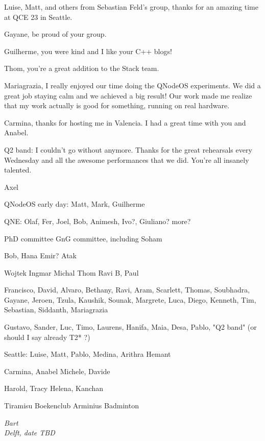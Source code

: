Luise, Matt, and others from Sebastian Feld's group, thanks for an amazing time at QCE 23 in Seattle.

Gayane, be proud of your group.

Guilherme, you were kind and I like your C++ blogs!

Thom, you're a great addition to the Stack team.

Mariagrazia, I really enjoyed our time doing the QNodeOS experiments. We did a great job staying calm and we achieved a big result! Our work made me realize that my work actually is good for something, running on real hardware.

Carmina, thanks for hosting me in Valencia. I had a great time with you and Anabel.

Q2 band: I couldn't go without anymore. Thanks for the great rehearsals every Wednesday and all the awesome performances that we did. You're all insanely talented.






Axel

QNodeOS early day: Matt, Mark, Guilherme

QNE: Olaf, Fer, Joel, Bob, Animesh, Ivo?, Giuliano? more?

PhD committee
GnG committee, including Soham

Bob, Hana
Emir?
Atak

Wojtek
Ingmar
Michal
Thom
Ravi B, Paul

Francisco, David, Alvaro, Bethany, Ravi, Aram, Scarlett, Thomas, Soubhadra, Gayane, Jeroen, Tzula, Kaushik, Sounak, Margrete, Luca, Diego, Kenneth, Tim, Sebastian, Siddanth, 
Mariagrazia

Gustavo, Sander, Luc, Timo, Laurens, Hanifa, Maia, Desa, Pablo, "Q2 band" (or should I say already T2* ?)

Seattle: Luise, Matt, Pablo, Medina, Arithra
Hemant

Carmina, Anabel
Michele, Davide

Harold, Tracy
Helena, Kanchan

Tiramisu
Boekenclub
Arminius
Badminton


\begin{flushright}
{\itshape
Bart \\
Delft, date TBD
}
\end{flushright}
